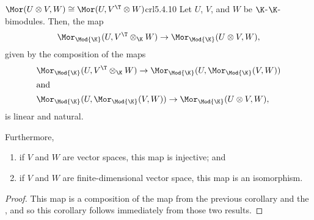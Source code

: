 \begin{crl}{$\Mor (U\otimes V,W)\cong \Mor (U,V^{\T}\otimes W)$}{crl5.4.10}
	Let $U$, $V$, and $W$ be $\K$-$\K$-bimodules.  Then, the map
	\begin{equation*}
		\Mor _{\Mod{\K}}(U,V^{\T}\otimes _{\K}W)\rightarrow \Mor _{\Mod{\K}}(U\otimes V,W),
	\end{equation*}
	given by the composition of the maps
	{\small
	\begin{subequations}
		\begin{align*}
			& \Mor _{\Mod{\K}}(U,V^{\T}\otimes _{\K}W)\rightarrow \Mor _{\Mod{\K}}(U,\Mor _{\Mod{\K}}(V,W)) \\
			\intertext{and}
			& \Mor _{\Mod{\K}}(U,\Mor _{\Mod{\K}}(V,W))\rightarrow \Mor _{\Mod{\K}}(U\otimes V,W),
		\end{align*}
	\end{subequations}
	}
	is linear and natural.
	
	Furthermore,
	\begin{enumerate}
		\item if $V$ and $W$ are vector spaces, this map is injective; and
		\item if $V$ and $W$ are finite-dimensional vector space, this map is an isomorphism.
	\end{enumerate}
	\begin{proof}
		This map is a composition of the map from the previous corollary and the , and so this corollary follows immediately from those two results.
	\end{proof}
\end{crl}
